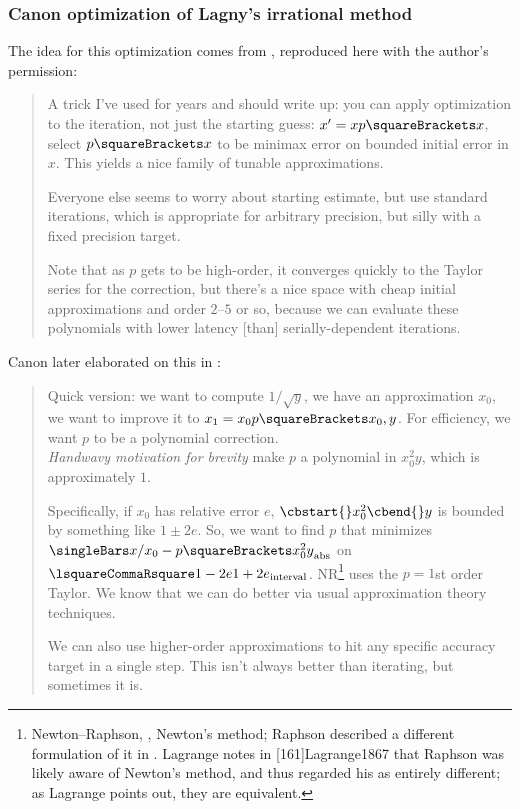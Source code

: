 ﻿\documentclass[10pt, a4paper, twoside]{basestyle}
\begin{document}
\subsubsection*{Canon optimization of Lagny's irrational method}
The idea for this optimization comes from \cite{Canon2018a}, reproduced here with the author’s permission:
\begin{quotation}
 A trick I’ve used for years and should write up: you can apply optimization to the iteration,
 not just the starting guess: $x' = x p\of x$, select $p\of x$ to be minimax error on bounded
 initial error in $x$. This yields a nice family of tunable approximations.

 Everyone else seems to worry about starting estimate, but use standard iterations,
 which is appropriate for arbitrary precision, but silly with a fixed precision target.

 Note that as $p$ gets to be high-order, it converges quickly to the Taylor series for the
 correction, but there's a nice space with cheap initial approximations and order $2$--$5$ or
 so, because we can evaluate these polynomials with lower latency [than] serially-dependent
 iterations.
\end{quotation}
Canon later elaborated on this in \cite{Canon2018b}:
\begin{quotation}
 Quick version: we want to compute $1/\sqrt{y}$, we have an approximation $x_0$, we want to
 improve it to $x_1 = x_0 p\of{x_0, y}$. For efficiency, we want $p$ to be a polynomial correction.\\
 \textit{Handwavy motivation for brevity} make $p$ a polynomial in $x_0^2y$, which is approximately $1$.

 Specifically, if $x_0$ has relative error $e$, $\cbstart{}x_0^2\cbend{}y$ is bounded by something like $1 \pm 2e$.
 So, we want to find $p$ that minimizes $\abs{x/x_0 - p\of{x_0^2y}}$ on $\intclos{1-2e}{1+2e}$.
 NR\footnote{Newton--Raphson, \idest, Newton's method; Raphson described a different formulation of it in \cite{Raphson1690}.
Lagrange notes in [161]{Lagrange1867} that Raphson was likely aware of Newton's method, and thus
regarded his as entirely different; as Lagrange points out, they are equivalent.}
uses the $p = 1$st order Taylor. We know that we can do better via usual approximation theory techniques.

 We can also use higher-order approximations to hit any specific accuracy target in a single step.
 This isn't always better than iterating, but sometimes it is.
\end{quotation}
\end{document}
